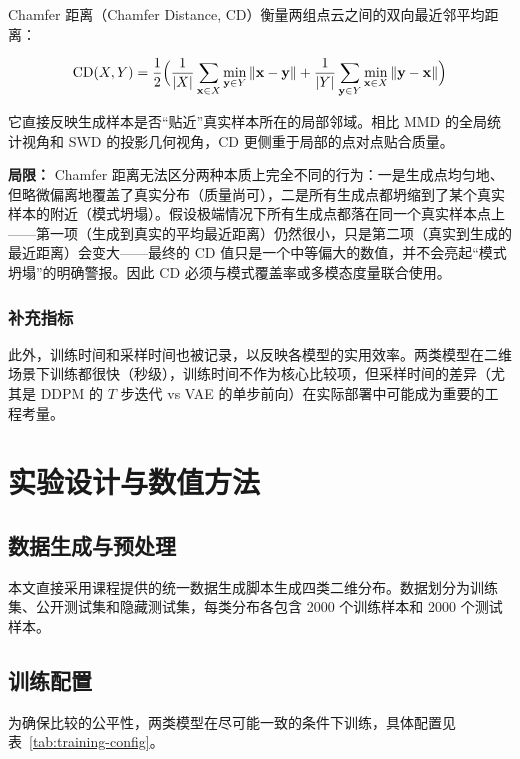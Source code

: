 \documentclass[UTF8,a4paper,12pt]{ctexart}
\begin{document}
Chamfer 距离（Chamfer Distance, CD）衡量两组点云之间的双向最近邻平均距离：

\begin{equation}
	\mathrm{CD}(X,Y) = \frac{1}{2}\Bigl(\frac{1}{|X|}\sum_{\mathbf{x}\in X}\min_{\mathbf{y}\in Y}\|\mathbf{x}-\mathbf{y}\| + \frac{1}{|Y|}\sum_{\mathbf{y}\in Y}\min_{\mathbf{x}\in X}\|\mathbf{y}-\mathbf{x}\|\Bigr)
\end{equation}

它直接反映生成样本是否“贴近”真实样本所在的局部邻域。相比 MMD 的全局统计视角和 SWD 的投影几何视角，CD 更侧重于局部的点对点贴合质量。

\textbf{局限：} Chamfer 距离无法区分两种本质上完全不同的行为：一是生成点均匀地、但略微偏离地覆盖了真实分布（质量尚可），二是所有生成点都坍缩到了某个真实样本的附近（模式坍塌）。假设极端情况下所有生成点都落在同一个真实样本点上——第一项（生成到真实的平均最近距离）仍然很小，只是第二项（真实到生成的最近距离）会变大——最终的 CD 值只是一个中等偏大的数值，并不会亮起“模式坍塌”的明确警报。因此 CD 必须与模式覆盖率或多模态度量联合使用。


\subsubsection{补充指标}

此外，训练时间和采样时间也被记录，以反映各模型的实用效率。两类模型在二维场景下训练都很快（秒级），训练时间不作为核心比较项，但采样时间的差异（尤其是 DDPM 的 $T$ 步迭代 vs VAE 的单步前向）在实际部署中可能成为重要的工程考量。

\section{实验设计与数值方法}

\subsection{数据生成与预处理}

本文直接采用课程提供的统一数据生成脚本生成四类二维分布。数据划分为训练集、公开测试集和隐藏测试集，每类分布各包含 2000 个训练样本和 2000 个测试样本。

\subsection{训练配置}

为确保比较的公平性，两类模型在尽可能一致的条件下训练，具体配置见表~\ref{tab:training-config}。
\end{document}
